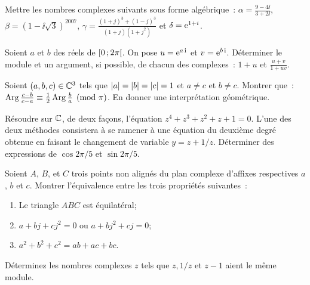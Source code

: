 \begin{exercice}
    Mettre les nombres complexes suivants sous forme algébrique~: \(\alpha = 
    \frac{9-4\ii}{3 + 2\ii}\), \(\beta = (1-\ii\sqrt{3})^{2007}\), \(\gamma = 
    \frac{(1 + j)^3 + (1-j)^3}{(1 + j)(1 + j^2)}\) et \( \delta = \operatorname{e}^{1 + i}\).
\end{exercice}

\begin{exercice}
    Soient \(a\) et \(b\) des réels de \(\left[ 0 \, ;  2\pi \right[\). On pose \(u = 
    \operatorname{e}^{a\operatorname{i}}\) et \(v = \operatorname{e}^{b\operatorname{i}}\). Déterminer le module et un argument, si 
    possible, de chacun des complexes~: \(1 + u\) et \(\frac{u + v}{1 + uv}\).
\end{exercice}

\begin{exercice}
    Soient \((a, b, c) \in \mathbb{C}^3\) tels que \(\left\lvert a\right\rvert = \left\lvert b\right\rvert = \left\lvert c\right\rvert = 1\) 
    et \(a \neq c\) et \(b \neq c\). Montrer que~:\(\operatorname{Arg} \frac{c-b}{c-a} \equiv 
    \frac{1}{2} \operatorname{Arg} \frac{b}{a} \pmod \pi\). En donner une interprétation 
    géométrique.
\end{exercice}

\begin{exercice}
    Résoudre sur \(\mathbb{C}\), de deux façons, l'équation \(z^4 + z^3 + z^2 + z + 1 = 
    0\). L'une des deux méthodes consistera à se ramener à une équation du 
    deuxième degré obtenue en faisant le changement de variable \(y = z + 1/z\).  
    Déterminer des expressions de \(\cos 2\pi/5\) et \(\sin 2\pi/5\).
\end{exercice}

\begin{exercice}
    Soient \(A\), \(B\), et \(C\) trois points non alignés du plan complexe 
    d'affixes respectives \(a\), \(b\) et \(c\). Montrer l'équivalence entre les 
    trois propriétés suivantes~:
    \begin{enumerate}
        \item Le triangle \(ABC\) est équilatéral;
        \item \(a + bj + cj^2 = 0\) ou \(a + bj^2 + cj = 0\);
        \item \(a^2 + b^2 + c^2 = ab + ac + bc\).
    \end{enumerate}
\end{exercice}

\begin{exercice}
    Déterminez les nombres complexes \(z\) tels que \(z, 1/z\) et \(z-1\) aient 
    le même module.
\end{exercice}


